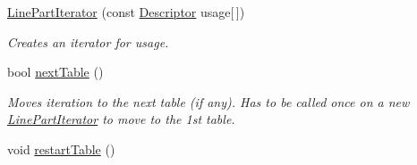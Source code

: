 \begin{DoxyCompactItemize}
\item 
\hypertarget{classxmem_1_1config_1_1third__party_1_1_print_usage_implementation_1_1_line_part_iterator_affaa574a17d4cbc561d6281cc379641f}{}\hyperlink{classxmem_1_1config_1_1third__party_1_1_print_usage_implementation_1_1_line_part_iterator_affaa574a17d4cbc561d6281cc379641f}{Line\+Part\+Iterator} (const \hyperlink{structxmem_1_1config_1_1third__party_1_1_descriptor}{Descriptor} usage\mbox{[}$\,$\mbox{]})\label{classxmem_1_1config_1_1third__party_1_1_print_usage_implementation_1_1_line_part_iterator_affaa574a17d4cbc561d6281cc379641f}

\begin{DoxyCompactList}\small\item\em Creates an iterator for {\ttfamily usage}. \end{DoxyCompactList}\item 
bool \hyperlink{classxmem_1_1config_1_1third__party_1_1_print_usage_implementation_1_1_line_part_iterator_a8c9cebd37c34729868760e6b85d00230}{next\+Table} ()
\begin{DoxyCompactList}\small\item\em Moves iteration to the next table (if any). Has to be called once on a new \hyperlink{classxmem_1_1config_1_1third__party_1_1_print_usage_implementation_1_1_line_part_iterator}{Line\+Part\+Iterator} to move to the 1st table. \end{DoxyCompactList}\item 
\hypertarget{classxmem_1_1config_1_1third__party_1_1_print_usage_implementation_1_1_line_part_iterator_af02074920bfd407cc7a871a7b0edf5af}{}void \hyperlink{classxmem_1_1config_1_1third__party_1_1_print_usage_implementation_1_1_line_part_iterator_af02074920bfd407cc7a871a7b0edf5af}{restart\+Table} ()\label{classxmem_1_1config_1_1third__party_1_1_print_usage_implementation_1_1_line_part_iterator_af02074920bfd407cc7a871a7b0edf5af}


\end{DoxyCompactItemize}
